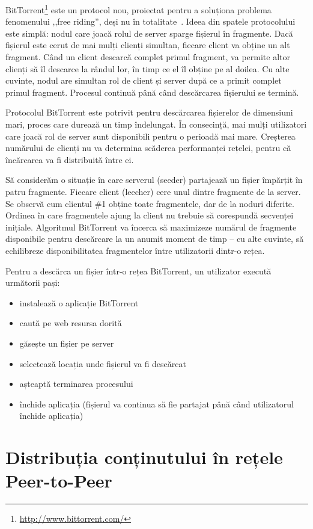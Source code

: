BitTorrent\footnote{\url{http://www.bittorrent.com/}} este un protocol nou,
proiectat pentru a soluționa problema fenomenului ,,free riding'', deși nu
în totalitate~\cite{free-riding}. Ideea din spatele protocolului este simplă:
nodul care joacă rolul de server sparge fișierul în fragmente. Dacă fișierul
este cerut de mai mulți clienți simultan, fiecare client va obține un
alt fragment. Când un client descarcă complet primul fragment, va permite
altor clienți să îl descarce la rândul lor, în timp ce el îl obține pe al
doilea. Cu alte cuvinte, nodul are simultan rol de client și server după ce
a primit complet primul fragment. Procesul continuă până când descărcarea
fișierului se termină.

Protocolul BitTorrent este potrivit pentru descărcarea fișierelor de dimensiuni
mari, proces care durează un timp îndelungat. În consecință, mai mulți
utilizatori care joacă rol de server sunt disponibili pentru o perioadă mai
mare. Creșterea numărului de clienți nu va determina scăderea performanței
rețelei, pentru că încărcarea va fi distribuită între ei.

Să considerăm o situație în care serverul (seeder) partajează un fișier
împărțit în patru fragmente. Fiecare client (leecher) cere unul dintre
fragmente de la server. Se observă cum clientul \#1 obține toate fragmentele,
dar de la noduri diferite. Ordinea în care fragmentele ajung la client nu
trebuie să corespundă secvenței inițiale. Algoritmul BitTorrent va încerca
să maximizeze numărul de fragmente disponibile pentru descărcare la un anumit
moment de timp -- cu alte cuvinte, să echilibreze disponibilitatea fragmentelor
între utilizatorii dintr-o rețea.

Pentru a descărca un fișier într-o rețea BitTorrent, un utilizator execută
următorii pași:

\begin{itemize}
  \item instalează o aplicație BitTorrent
  \item caută pe web resursa dorită
  \item găsește un fișier pe server
  \item selectează locația unde fișierul va fi descărcat
  \item așteaptă terminarea procesului
  \item închide aplicația (fișierul va continua să fie partajat
                până când utilizatorul închide aplicația)
\end{itemize}

\section{Distribuția conținutului în rețele Peer-to-Peer}
\label{sec:p2p-systems:streaming}

